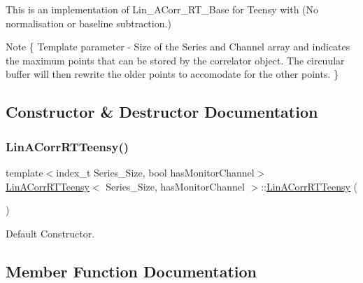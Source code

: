 This is an implementation of Lin\+\_\+\+A\+Corr\+\_\+\+R\+T\+\_\+\+Base for Teensy with {\bfseries }(No normalisation or baseline subtraction.) 

\begin{DoxyNote}{Note}
\{ Template parameter -\/ Size of the Series and Channel array and indicates the maximum points that can be stored by the correlator object. The circuular buffer will then rewrite the older points to accomodate for the other points. \} 
\end{DoxyNote}


\subsection{Constructor \& Destructor Documentation}
\mbox{\label{classLinACorrRTTeensy_aebb83829899235fe5177de735a5367da}} 
\subsubsection{\texorpdfstring{Lin\+A\+Corr\+R\+T\+Teensy()}{LinACorrRTTeensy()}}
{\footnotesize\ttfamily template$<$index\+\_\+t Series\+\_\+\+Size, bool has\+Monitor\+Channel$>$ \\
\hyperlink{classLinACorrRTTeensy}{Lin\+A\+Corr\+R\+T\+Teensy}$<$ Series\+\_\+\+Size, has\+Monitor\+Channel $>$\+::\hyperlink{classLinACorrRTTeensy}{Lin\+A\+Corr\+R\+T\+Teensy} (\begin{DoxyParamCaption}{ }\end{DoxyParamCaption})\hspace{0.3cm}{\ttfamily [inline]}}



Default Constructor. 



\subsection{Member Function Documentation}
\mbox{\label{classLinACorrRTTeensy_a967f1b3ea7e6ebdae8c9bf7c2c641e49}} 

